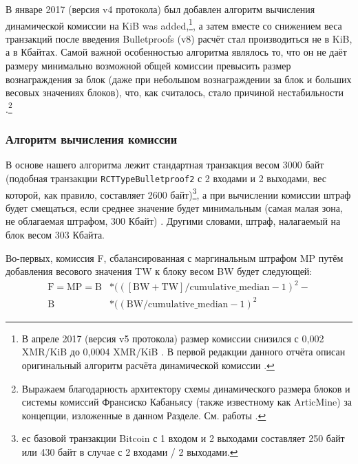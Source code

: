 В январе 2017 (версия v4 протокола) был добавлен алгоритм вычисления динамической комиссии на KiB \cite{articmine-fee-video, articmine-36c3-dynamics, articmine-defcon27-video, jollymore-old-analysis} was added,\footnote{В апреле 2017 (версия v5 протокола) размер комиссии снизился с 0,002 XMR/KiB до 0,0004 XMR/KiB \cite{monero-v5}. В первой редакции данного отчёта описан оригинальный алгоритм расчёта динамической комиссии \cite{ztm-1}.}, а затем вместе со снижением веса транзакций после введения Bulletproofs (v8) расчёт стал производиться не в KiB, а в Кбайтах. Самой важной особенностью алгоритма являлось то, что он не даёт размеру минимально возможной общей комиссии превысить размер вознаграждения за блок (даже при небольшом вознагра\-ждении за блок и больших весовых значениях блоков), что, как считалось, стало причиной нестабильности \cite{fee-reward-instability, no-reward-instability, selfish-miner}.\footnote{Выражаем благодарность архитектору схемы динамического размера блоков и системы комиссий Франсиско Кабаньясу (также известному как ArticMine) за концепции, изложенные в данном Разделе. См. работы \cite{articmine-fee-video, articmine-36c3-dynamics, articmine-defcon27-video}.}%

\subsubsection*{Алгоритм вычисления комиссии}

В основе нашего алгоритма лежит стандартная транзакция \cite{jollymore-old-analysis} весом 3000 байт (подобная транзакции {\tt RCTTypeBulletproof2} с 2 входами и 2 выходами, вес которой, как правило, состав\-ляет 2600 байт)\footnote{ес базовой транзакции Bitcoin с 1 входом и 2 выходами составляет 250 байт \cite{bitcoin-txsizes-2015} или 430 байт в случае с 2 входами / 2 выходами.}, а при вычислении комиссии штраф будет смещаться, если среднее значение будет минимальным (самая малая зона, не облагаемая штрафом, 300 Кбайт) \cite{articmine-36c3-dynamics}. Другими словами, штраф, налагаемый на блок весом 303 Кбайта.%

Во-первых, комиссия F, сбалансированная с маргинальным штрафом MP путём добавления весового значения TW к блоку весом BW будет следующей:\vspace{.175cm}
\begin{align*}
    \textrm{F} = \textrm{MP} = \textrm{B}&*(([\textrm{BW} + \textrm{TW}]/\textrm{cumulative\_median} - 1)^2 -\\ \textrm{B}&*((\textrm{BW}/\textrm{cumulative\_median} - 1)^2
\end{align*}{}

